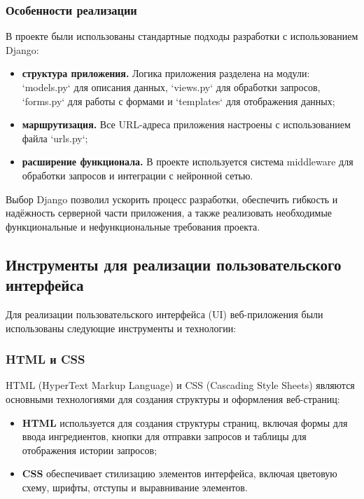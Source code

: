 {{\subsubsection*{Особенности реализации}
В проекте были использованы стандартные подходы разработки с использованием Django:
\begin{itemize}
    \item \textbf{структура приложения.} Логика приложения разделена на модули: `models.py` для описания данных, `views.py` для обработки запросов, `forms.py` для работы с формами и `templates` для отображения данных;
    \item \textbf{маршрутизация.} Все URL-адреса приложения настроены с использованием файла `urls.py`;
    \item \textbf{расширение функционала.} В проекте используется система middleware для обработки запросов и интеграции с нейронной сетью.
\end{itemize}

Выбор Django позволил ускорить процесс разработки, обеспечить гибкость и надёжность серверной части приложения, а также реализовать необходимые функциональные и нефункциональные требования проекта.
}
\subsection{Инструменты для реализации пользовательского интерфейса}
Для реализации пользовательского интерфейса (UI) веб-приложения были использованы следующие инструменты и технологии:

\subsubsection*{HTML и CSS}
HTML (HyperText Markup Language) и CSS (Cascading Style Sheets) являются основными технологиями для создания структуры и оформления веб-страниц:
\begin{itemize}
    \item \textbf{HTML} используется для создания структуры страниц, включая формы для ввода ингредиентов, кнопки для отправки запросов и таблицы для отображения истории запросов;
    \item \textbf{CSS} обеспечивает стилизацию элементов интерфейса, включая цветовую схему, шрифты, отступы и выравнивание элементов.
\end{itemize}

}
